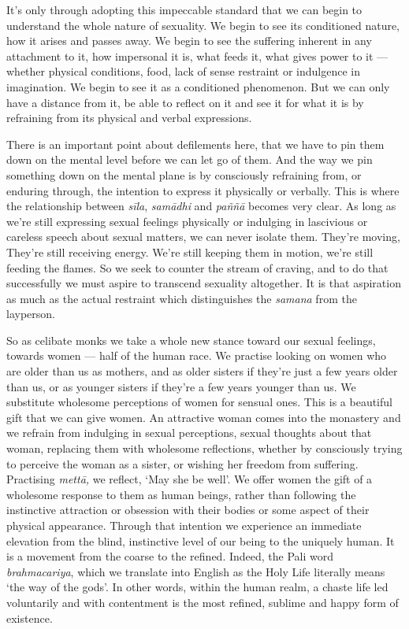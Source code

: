 It's only through adopting this impeccable standard that we can begin to
understand the whole nature of sexuality. We begin to see its
conditioned nature, how it arises and passes away. We begin to see the
suffering inherent in any attachment to it, how impersonal it is, what
feeds it, what gives power to it --- whether physical conditions, food,
lack of sense restraint or indulgence in imagination. We begin to see it
as a conditioned phenomenon. But we can only have a distance from it, be
able to reflect on it and see it for what it is by refraining from its
physical and verbal expressions.

There is an important point about defilements here, that we have to pin
them down on the mental level before we can let go of them. And the way
we pin something down on the mental plane is by consciously refraining
from, or enduring through, the intention to express it physically or
verbally. This is where the relationship between \emph{sīla},
\emph{samādhi} and \emph{paññā} becomes very clear. As long as we're
still expressing sexual feelings physically or indulging in lascivious
or careless speech about sexual matters, we can never isolate them.
They're moving, They're still receiving energy. We're still keeping them
in motion, we're still feeding the flames. So we seek to counter the
stream of craving, and to do that successfully we must aspire to
transcend sexuality altogether. It is that aspiration as much as the
actual restraint which distinguishes the \emph{samana} from the
layperson.

So as celibate monks we take a whole new stance toward our sexual
feelings, towards women --- half of the human race. We practise looking
on women who are older than us as mothers, and as older sisters if
they're just a few years older than us, or as younger sisters if they're
a few years younger than us. We substitute wholesome perceptions of
women for sensual ones. This is a beautiful gift that we can give women.
An attractive woman comes into the monastery and we refrain from
indulging in sexual perceptions, sexual thoughts about that woman,
replacing them with wholesome reflections, whether by consciously trying
to perceive the woman as a sister, or wishing her freedom from
suffering. Practising \emph{mettā,} we reflect, `May she be well'. We
offer women the gift of a wholesome response to them as human beings,
rather than following the instinctive attraction or obsession with their
bodies or some aspect of their physical appearance. Through that
intention we experience an immediate elevation from the blind,
instinctive level of our being to the uniquely human. It is a movement
from the coarse to the refined. Indeed, the Pali word
\emph{brahmacariya}, which we translate into English as the Holy Life
literally means `the way of the gods'. In other words, within the human
realm, a chaste life led voluntarily and with contentment is the most
refined, sublime and happy form of existence.

